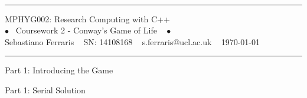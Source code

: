 \documentclass[11pt, twoside]{article}
\newcommand{\cambiaFont}[2]{{\fontencoding{T1}\fontfamily{#1}%
		\selectfont#2}}
\begin{document}
\setcounter{page}{1}
\pagestyle{fancy} 



~\vspace{-2cm} 
\begin{center}  	
	
	\hrule
	
	\vspace{0.5cm} 
	\color{Black} MPHYG002: Research Computing with C++ \color{Black}
	\vspace{0.5cm} \\
	\cambiaFont{ppl}{ \color{MidnightBlue} $\bullet$ \color{MidnightBlue} ~{\Large Coursework 2 - Conway's Game of Life } ~ \color{MidnightBlue}$\bullet$\color{black}} 
	\vspace{0.3cm} \\
	Sebastiano Ferraris  ~ SN: 14108168 ~  s.ferraris@ucl.ac.uk ~ \today 
	\vspace{0.5cm} 
	\hrule
	
\end{center}

\vspace{0.1in}







\begin{center}
	\color{MidnightBlue} {\Large Part 1: Introducing the Game }\color{Black} 
\end{center}


\begin{center}
	\color{MidnightBlue} {\Large Part 1: Serial Solution }\color{Black} 
\end{center}


\end{document}
